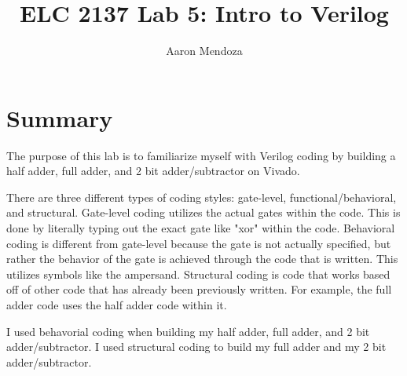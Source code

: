 \documentclass[11pt]{article}
\begin{document}
\title{ELC 2137 Lab 5: Intro to Verilog}
\author{Aaron Mendoza}

\maketitle


\section*{Summary}

The purpose of this lab is to familiarize myself with Verilog coding by building a half adder, full adder, and 2 bit adder/subtractor on Vivado. 

There are three different types of coding styles: gate-level, functional/behavioral, and structural. Gate-level coding utilizes the actual gates within the code. This is done by literally typing out the exact gate like "xor" within the code. Behavioral coding is different from gate-level because the gate is not actually specified, but rather the behavior of the gate is achieved through the code that is written. This utilizes symbols like the ampersand. Structural coding is code that works based off of other code that has already been previously written. For example, the full adder code uses the half adder code within it. 

I used behavorial coding when building my half adder, full adder, and 2 bit adder/subtractor. I used structural coding to build my full adder and my 2 bit adder/subtractor.
\end{document}
